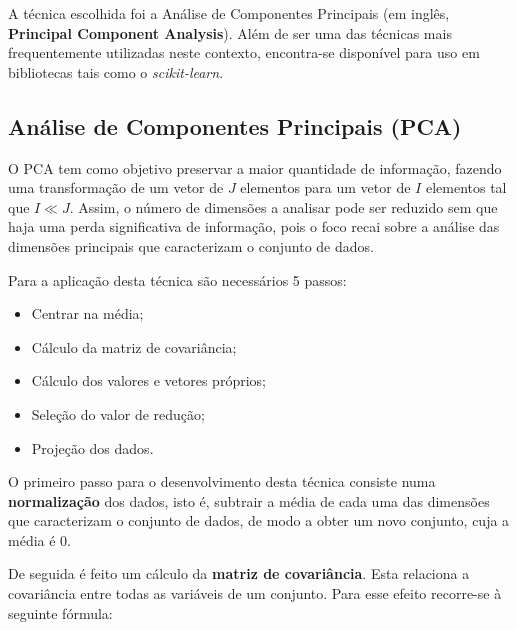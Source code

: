 \par A técnica escolhida foi a Análise de Componentes Principais (em inglês, \textbf{Principal Component Analysis}). Além de ser uma das técnicas mais frequentemente utilizadas neste contexto, encontra-se disponível para uso em bibliotecas tais como o \textit{scikit-learn}.


\subsection{Análise de Componentes Principais (PCA)}

\par O PCA tem como objetivo preservar a maior quantidade de informação, fazendo
uma transformação de um vetor de $J$ elementos para um vetor de $I$ elementos
tal que $I \ll J$.
Assim, o número de dimensões a analisar pode ser reduzido sem que haja uma perda significativa de informação, pois o foco 
recai sobre a análise das dimensões principais que caracterizam o conjunto de dados.

\vspace{0.5em}

\par Para a aplicação desta técnica são necessários 5 passos:

\begin{itemize}
    \item Centrar na média;
    \item Cálculo da matriz de covariância;
    \item Cálculo dos valores e vetores próprios;
    \item Seleção do valor de redução;
    \item Projeção dos dados.
\end{itemize}

\vspace{0.5em}

\par O primeiro passo para o desenvolvimento desta técnica consiste numa \textbf{normalização} dos dados, isto é, subtrair a média de cada uma das dimensões que caracterizam o conjunto de dados, de modo a obter um novo conjunto, cuja a média é 0.

\vspace{0.5em}

\par De seguida é feito um cálculo da \textbf{matriz de covariância}. Esta relaciona a covariância entre todas as variáveis de um conjunto. Para esse efeito recorre-se à seguinte fórmula:

